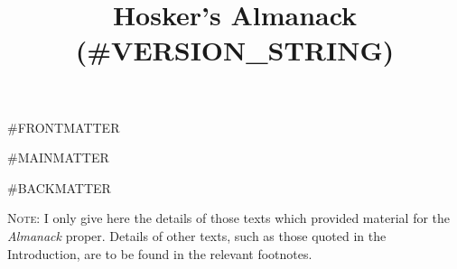 \documentclass{amsbook}
\title{Hosker's Almanack (#VERSION_STRING)}
\begin{document}
\frontmatter

\maketitle

\tableofcontents

\listoffigures

#FRONTMATTER

\mainmatter

\renewcommand\thesection{{\Roman{section}}}
\renewcommand\thefootnote{{\thesubsection.}}
\makeatletter
    \def\blfootnote{\xdef\@thefnmark{}\@footnotetext}
    \renewcommand{\@makefnmark}{\hbox{{{{\@thefnmark}}}}\hbox{{{{ }}}}}
\makeatother

#MAINMATTER


\renewcommand\thesection{{\arabic{section}}}
\renewcommand\thefootnote{{\arabic{section}}}

#BACKMATTER

\printbibliography[title={Sources}]

\bigskip

{\footnotesize \textsc{Note:} I only give here the details of those texts which provided material for the \textit{Almanack} proper. Details of other texts, such as those quoted in the Introduction, are to be found in the relevant footnotes.}
\end{document}
